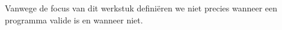 Vanwege de focus van dit werkstuk definiëren we niet precies wanneer een programma valide is en wanneer niet.

